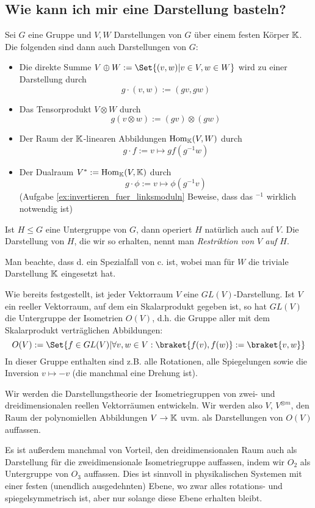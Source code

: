 \subsection{Wie kann ich mir eine Darstellung basteln?}
\begin{lemmadef}
Sei $G$ eine Gruppe und $V,W$ Darstellungen von $G$ über einem festen Körper $\mathbb{K}$. Die folgenden sind dann auch Darstellungen von $G$:
\begin{itemize}
\item Die direkte Summe $V\oplus W := \Set{(v,w) | v\in V, w\in W}$ wird zu einer Darstellung durch
\[g\cdot(v,w) := (gv,gw)\]
\item Das Tensorprodukt $V\otimes W$ durch
\[g(v\otimes w) := (gv)\otimes (gw)\]
\item Der Raum der $\mathbb{K}$-linearen Abbildungen $\operatorname{Hom}_{\mathbb{K}}(V,W)$ durch
\[g\cdot f := v\mapsto gf(g^{-1} w)\]
\item Der Dualraum $V^\ast:= \operatorname{Hom}_{\mathbb{K}}(V,\mathbb{K})$ durch
\[g\cdot \phi := v\mapsto \phi(g^{-1} v)\]
(Aufgabe \ref{ex:invertieren_fuer_linksmoduln} Beweise, dass das $^{-1}$ wirklich notwendig ist)
\end{itemize}
Ist $H\leq G$ eine Untergruppe von $G$, dann operiert $H$ natürlich auch auf $V$. Die Darstellung von $H$, die wir so erhalten, nennt man \emph{Restriktion von $V$ auf $H$}.
\end{lemmadef}

\begin{remark}
Man beachte, dass d. ein Spezialfall von c. ist, wobei man für $W$ die triviale Darstellung $\mathbb{K}$ eingesetzt hat.
\end{remark}

\begin{example}
Wie bereits festgestellt, ist jeder Vektorraum $V$ eine $GL(V)$-Darstellung. Ist $V$ ein reeller Vektorraum, auf dem ein Skalarprodukt gegeben ist, so hat $GL(V)$ die Untergruppe der Isometrien $O(V)$, d.h. die Gruppe aller mit dem Skalarprodukt verträglichen Abbildungen:
\[O(V) := \Set{f\in GL(V) | \forall v,w\in V: \braket{f(v),f(w)} := \braket{v,w}}\]
In dieser Gruppe enthalten sind z.B. alle Rotationen, alle Spiegelungen sowie die Inversion $v\mapsto -v$ (die manchmal eine Drehung ist).

\smallbreak
Wir werden die Darstellungstheorie der Isometriegruppen von zwei- und dreidimensionalen reellen Vektorräumen entwickeln. Wir werden also $V$, $V^{\otimes m}$, den Raum der polynomiellen Abbildungen $V\to\mathbb{K}$ uvm. als Darstellungen von $O(V)$ auffassen.

\smallbreak
Es ist außerdem manchmal von Vorteil, den dreidimensionalen Raum auch als Darstellung für die zweidimensionale Isometriegruppe auffassen, indem wir $O_2$ als Untergruppe von $O_3$ auffassen. Dies ist sinnvoll in physikalischen Systemen mit einer festen (unendlich ausgedehnten) Ebene, wo zwar alles rotations- und spiegelsymmetrisch ist, aber nur solange diese Ebene erhalten bleibt.
\end{example}

